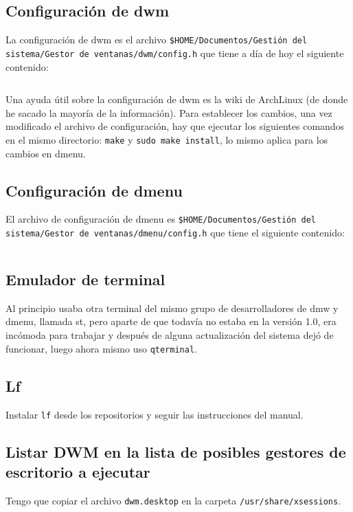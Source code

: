 \documentclass{article}
\begin{document}
    \subsection{Configuración de dwm}
    La configuración de dwm es el archivo \texttt{\$HOME/Documentos/Gestión del sistema/\-Gestor de ventanas/dwm/config.h} que tiene a día de hoy el siguiente contenido:

    \inputminted[breaklines, breakanywhere, breaksymbolleft="", breaksymbolright="", breakanywheresymbolpre="", breakanywheresymbolpost=""]{c}{inc/config.h}
    
    Una ayuda útil sobre la configuración de dwm es la wiki de ArchLinux (de donde he sacado la mayoría de la información).
    Para establecer los cambios, una vez modificado el archivo de configuración, hay que ejecutar los siguientes comandos en el mismo directorio: \texttt{make} y \texttt{sudo make install}, lo mismo aplica para los cambios en dmenu.

    \subsection{Configuración de dmenu}
    El archivo de configuración de dmenu es \texttt{\$HOME/Documentos/Gestión del sistema/Gestor de ventanas/dmenu/config.h} que tiene el siguiente contenido:

    \inputminted[breaklines, breakanywhere, breaksymbolleft="", breaksymbolright="", breakanywheresymbolpre="", breakanywheresymbolpost=""]
    {bash}{inc/config-dmenu.h}
    
    \subsection{Emulador de terminal}
    Al principio usaba otra terminal del mismo grupo de desarrolladores de dmw y dmenu, llamada st, pero aparte de que todavía no estaba en la versión 1.0, era incómoda para trabajar
    y después de alguna actualización del sistema dejó de funcionar, luego ahora mismo uso \texttt{qterminal}.

    \subsection{Lf}
    Instalar \texttt{lf} desde los repositorios y seguir las instrucciones del
    manual.

    \subsection{Listar DWM en la lista de posibles gestores de escritorio a
    ejecutar}
    Tengo que copiar el archivo \texttt{dwm.desktop} en la carpeta
    \texttt{/usr/share/xsessions}.
\end{document}
